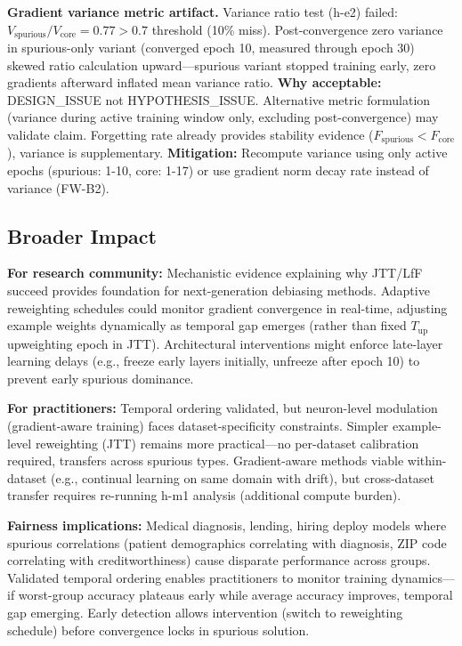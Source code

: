 \textbf{Gradient variance metric artifact.} Variance ratio test (h-e2) failed: $V_{\text{spurious}} / V_{\text{core}} = 0.77 > 0.7$ threshold (10\% miss). Post-convergence zero variance in spurious-only variant (converged epoch 10, measured through epoch 30) skewed ratio calculation upward---spurious variant stopped training early, zero gradients afterward inflated mean variance ratio. \textbf{Why acceptable:} DESIGN\_ISSUE not HYPOTHESIS\_ISSUE. Alternative metric formulation (variance during active training window only, excluding post-convergence) may validate claim. Forgetting rate already provides stability evidence ($F_{\text{spurious}} < F_{\text{core}}$), variance is supplementary. \textbf{Mitigation:} Recompute variance using only active epochs (spurious: 1-10, core: 1-17) or use gradient norm decay rate instead of variance (FW-B2).

\subsection{Broader Impact}

\textbf{For research community:} Mechanistic evidence explaining why JTT/LfF succeed provides foundation for next-generation debiasing methods. Adaptive reweighting schedules could monitor gradient convergence in real-time, adjusting example weights dynamically as temporal gap emerges (rather than fixed $T_{\text{up}}$ upweighting epoch in JTT). Architectural interventions might enforce late-layer learning delays (e.g., freeze early layers initially, unfreeze after epoch 10) to prevent early spurious dominance.

\textbf{For practitioners:} Temporal ordering validated, but neuron-level modulation (gradient-aware training) faces dataset-specificity constraints. Simpler example-level reweighting (JTT) remains more practical---no per-dataset calibration required, transfers across spurious types. Gradient-aware methods viable within-dataset (e.g., continual learning on same domain with drift), but cross-dataset transfer requires re-running h-m1 analysis (additional compute burden).

\textbf{Fairness implications:} Medical diagnosis, lending, hiring deploy models where spurious correlations (patient demographics correlating with diagnosis, ZIP code correlating with creditworthiness) cause disparate performance across groups. Validated temporal ordering enables practitioners to monitor training dynamics---if worst-group accuracy plateaus early while average accuracy improves, temporal gap emerging. Early detection allows intervention (switch to reweighting schedule) before convergence locks in spurious solution.
